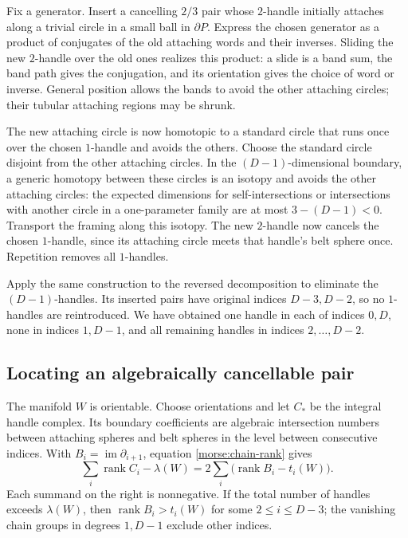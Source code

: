 Fix a generator.  Insert a cancelling $2/3$ pair whose $2$-handle
initially attaches along a trivial circle in a small ball in $\partial P$.
Express the chosen generator as a product of conjugates of the old
attaching words and their inverses.  Sliding the new $2$-handle over
the old ones realizes this product: a slide is a band sum, the band
path gives the conjugation, and its orientation gives the choice of
word or inverse.  General position allows the bands to avoid the other
attaching circles; their tubular attaching regions may be shrunk.

The new attaching circle is now homotopic to a standard circle that
runs once over the chosen $1$-handle and avoids the others.  Choose the
standard circle disjoint from the other attaching circles.  In the
$(D-1)$-dimensional boundary, a generic homotopy between these circles
is an isotopy and avoids the other attaching circles: the expected
dimensions for self-intersections or intersections with another circle
in a one-parameter family are at most $3-(D-1)<0$.
Transport the framing along this isotopy.  The new $2$-handle now
cancels the chosen $1$-handle, since its attaching circle meets that
handle's belt sphere once.  Repetition removes all $1$-handles.

Apply the same construction to the reversed decomposition to eliminate
the $(D-1)$-handles.  Its inserted pairs have original indices
$D-3,D-2$, so no $1$-handles are reintroduced.  We have obtained one
handle in each of indices $0,D$, none in indices $1,D-1$, and all
remaining handles in indices $2,\ldots,D-2$.

\subsection{Locating an algebraically cancellable pair}

The manifold $W$ is orientable.  Choose orientations and let $C_*$ be
the integral handle complex.  Its boundary coefficients are algebraic
intersection numbers between attaching spheres and belt spheres in the
level between consecutive indices.  With
$B_i=\operatorname{im}\partial_{i+1}$, equation
\eqref{morse:chain-rank} gives
\begin{equation}\label{handle:excess}
 \sum_i\operatorname{rank}C_i-\lambda(W)
 =2\sum_i\bigl(\operatorname{rank}B_i-t_i(W)\bigr).
\end{equation}
Each summand on the right is nonnegative.  If the total number of
handles exceeds $\lambda(W)$, then
$\operatorname{rank}B_i>t_i(W)$ for some $2\leq i\leq D-3$;
the vanishing chain groups in degrees $1,D-1$ exclude other indices.

